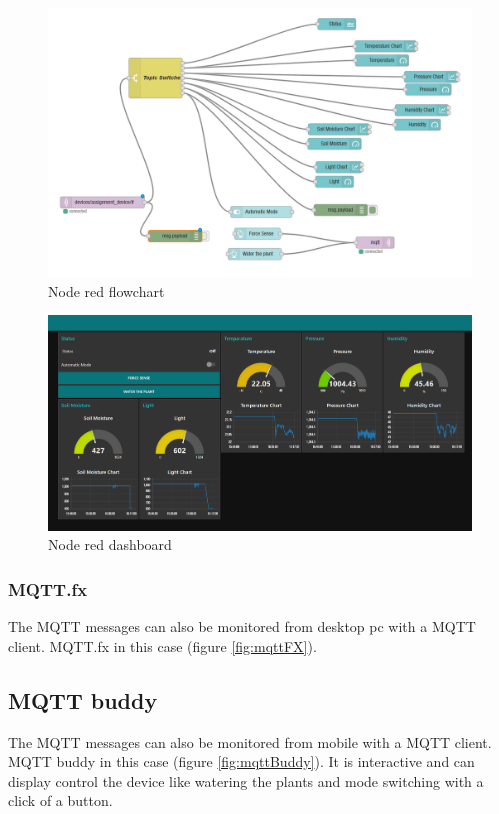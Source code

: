 \documentclass[11pt,a4paper]{article}
\begin{document}
\begin{figure}
\begin{center}
\includegraphics[scale=0.52]{node_red}
\end{center}
\caption{Node red flowchart}
\label{fig:nodeRed}
\end{figure}

\begin{figure}
\begin{center}
\includegraphics[scale=0.3]{node_red_panel}
\end{center}
\caption{Node red dashboard}
\label{fig:nodeRedDash}
\end{figure}

\subsubsection{MQTT.fx}
The MQTT messages can also be monitored from desktop pc with a MQTT client. MQTT.fx in this case (figure \ref{fig:mqttFX}). 

\subsection{MQTT buddy}
The MQTT messages can also be monitored from mobile with a MQTT client. MQTT buddy in this case (figure \ref{fig:mqttBuddy}). It is interactive and can display control the device like watering the plants and mode switching with a click of a button.
\end{document}
